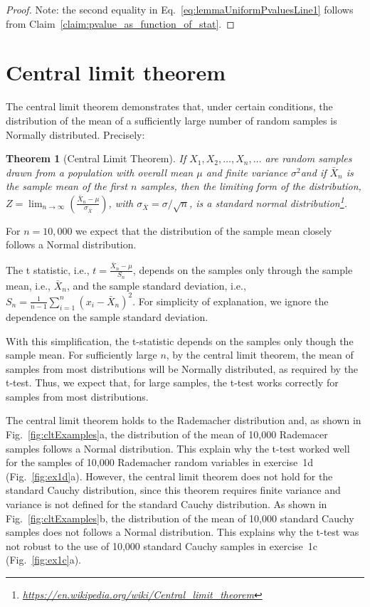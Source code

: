 \documentclass[12pt]{article}
\newtheorem{theorem}{Theorem}
\begin{document}
\begin{appendices}
\begin{proof}
Note: the second equality in Eq.~\ref{eq:lemmaUniformPvaluesLine1} follows
from Claim~\ref{claim:pvalue_as_function_of_stat}.

\end{proof}

\section{Central limit theorem}
\label{sec:clt}

The central limit theorem demonstrates that, under certain conditions, the
distribution of the mean of a sufficiently large number of random samples
is Normally distributed. Precisely:

\begin{theorem}[Central Limit Theorem]

If $X_{1},X_{2},\dots ,X_{n},\dots$ are random samples drawn from a population
    with overall mean $\mu$ and finite variance $\sigma^{2}$and if $\bar
    {X}_{n}$ is the sample mean of the first $n$ samples, then the limiting
    form of the distribution,
    $Z=\lim_{n\to\infty}\left(\frac{\bar{X}_{n}-\mu}{\sigma_{\bar{X}}}\right)$,
    with $\sigma _{\bar{X}}=\sigma/\sqrt{n}$, is a standard normal
    distribution\footnote{\url{https://en.wikipedia.org/wiki/Central_limit_theorem}}.

\end{theorem}

For $n=10,000$ we expect that the distribution of the sample mean closely
follows a Normal distribution.

The t statistic, i.e., $t=\frac{\bar{X}_n-\mu}{S_n}$, depends on the samples
only through the sample mean, i.e., $\bar{X}_n$, and the sample standard
deviation, i.e., $S_n=\frac{1}{n-1}\sum_{i=1}^n\left(x_i-\bar{X}_n\right)^2$.  For
simplicity of explanation, we ignore the dependence on the sample standard
deviation.

With this simplification, the t-statistic depends on the samples only though
the sample mean. For sufficiently large $n$, by the central limit theorem, the
mean of samples from most distributions will be Normally distributed, as
required by the t-test. Thus, we expect that, for large samples, the t-test
works correctly for samples from most distributions.

The central limit theorem holds to the Rademacher distribution and, as shown in
Fig.~\ref{fig:cltExamples}a, the distribution of the mean of 10,000 Rademacer
samples follows a Normal distribution. This explain why the t-test worked well
for the samples of 10,000 Rademacher random variables in exercise~1d
(Fig.~\ref{fig:ex1d}a).
%
However, the central limit theorem does not hold for the standard Cauchy
distribution, since this theorem requires finite
variance and variance is not defined for the standard Cauchy distribution. As
shown in Fig.~\ref{fig:cltExamples}b, the distribution of the mean of 10,000
standard Cauchy samples does not follows a Normal distribution.
This explains why the t-test was not robust to the use of 10,000 standard
Cauchy samples in exercise~1c (Fig.~\ref{fig:ex1c}a).


\end{appendices}
\end{document}
